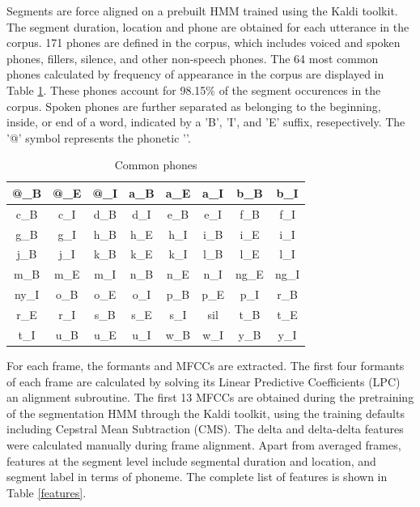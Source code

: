 \documentclass[conference]{IEEEtran}
\begin{document}
Segments are force aligned on a prebuilt HMM trained using the Kaldi toolkit.
The segment duration, location and phone are obtained for each utterance in the corpus.
171 phones are defined in the corpus, which includes voiced and spoken phones, fillers, silence, and other non-speech phones.
The 64 most common phones calculated by frequency of appearance in the corpus are displayed in Table \ref{phones}.
These phones account for 98.15\% of the segment occurences in the corpus.
Spoken phones are further separated as belonging to the beginning, inside, or end of a word, indicated by a 'B', 'I', and 'E' suffix, resepectively.
The '@' symbol represents the phonetic ''.

\begin{table}[!htb]
\renewcommand{\arraystretch}{1.3}
\caption{Common phones}
\label{phones}
\centering
\begin{tabular}{|c|c|c|c|c|c|c|c|}
    \hline
    @\_B & @\_E & @\_I & a\_B & a\_E & a\_I & b\_B & b\_I\\
    \hline
    c\_B & c\_I & d\_B & d\_I & e\_B & e\_I & f\_B & f\_I\\
    \hline
    g\_B & g\_I & h\_B & h\_E & h\_I & i\_B & i\_E & i\_I\\
    \hline
    j\_B & j\_I & k\_B & k\_E & k\_I & l\_B & l\_E & l\_I\\
    \hline
    m\_B & m\_E & m\_I & n\_B & n\_E & n\_I & ng\_E & ng\_I\\
    \hline
    ny\_I & o\_B & o\_E & o\_I & p\_B & p\_E & p\_I & r\_B\\
    \hline
    r\_E & r\_I & s\_B & s\_E & s\_I & sil & t\_B & t\_E\\
    \hline
    t\_I & u\_B & u\_E & u\_I & w\_B & w\_I & y\_B & y\_I\\
    \hline
\end{tabular}
\end{table}

For each frame, the formants and MFCCs are extracted.
The first four formants of each frame are calculated by solving its Linear Predictive Coefficients (LPC) an alignment subroutine.
The first 13 MFCCs are obtained during the pretraining of the segmentation HMM through the Kaldi toolkit, using the training defaults including Cepstral Mean Subtraction (CMS).
The delta and delta-delta features were calculated manually during frame alignment.
Apart from averaged frames, features at the segment level include segmental duration and location, and segment label in terms of phoneme.
The complete list of features is shown in Table \ref{features}.
\end{document}
